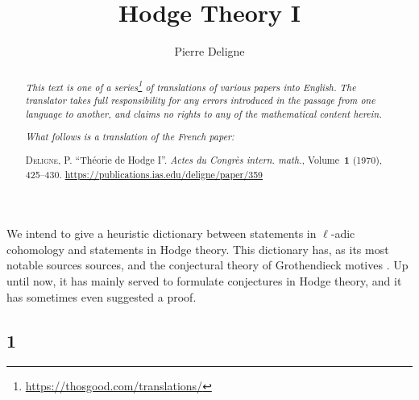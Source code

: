 \documentclass{article}
\title{Hodge Theory I}
\author{Pierre Deligne}
\date{}
\theoremstyle{plain}
\theoremstyle{definition}
\newcommand{\oldpage}[1]{\marginpar{\footnotesize$\Big\vert$ \textit{p.~#1}}}
\begin{document}
\maketitle
\thispagestyle{fancy}

\renewcommand{\abstractname}{Translator's note.}

\begin{abstract}
  \renewcommand*{\thefootnote}{\fnsymbol{footnote}}
  \emph{This text is one of a series\footnote{\url{https://thosgood.com/translations/}} of translations of various papers into English.}
  \emph{The translator takes full responsibility for any errors introduced in the passage from one language to another, and claims no rights to any of the mathematical content herein.}
  
  \emph{What follows is a translation of the French paper:}

  \medskip\noindent
  \textsc{Deligne, P.}
  ``Th\'{e}orie de Hodge I''.
  \emph{Actes du Congr\`{e}s intern. math.}, Volume~\textbf{1} (1970), 425--430.
  \url{https://publications.ias.edu/deligne/paper/359}
\end{abstract}

\setcounter{footnote}{0}

\bigskip



\oldpage{425}
We intend to give a heuristic dictionary between statements in $\ell$-adic cohomology and statements in Hodge theory.
This dictionary has, as its most notable sources sources, \cite{3} and the conjectural theory of Grothendieck motives \cite{2}.
Up until now, it has mainly served to formulate conjectures in Hodge theory, and it has sometimes even suggested a proof.


\subsection*{1}
\end{document}
